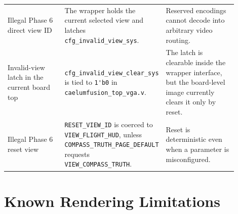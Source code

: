 \documentclass{article}
\newcommand{\sig}[1]{\begingroup\nolinkurl{#1}\endgroup}
\newcommand{\file}[1]{\begingroup\nolinkurl{#1}\endgroup}
\newcommand{\param}[1]{\begingroup\nolinkurl{#1}\endgroup}
\begin{document}
\begin{longtable}{p{0.26\linewidth} p{0.32\linewidth} p{0.32\linewidth}}
Illegal Phase 6 direct view ID &
The wrapper holds the current selected view and latches
\sig{cfg_invalid_view_sys}. &
Reserved encodings cannot decode into arbitrary video routing. \\

Invalid-view latch in the current board top &
\sig{cfg_invalid_view_clear_sys} is tied to \sig{1'b0} in
\file{caelumfusion_top_vga.v}. &
The latch is clearable inside the wrapper interface, but the board-level image
currently clears it only by reset. \\

Illegal Phase 6 reset view &
\param{RESET_VIEW_ID} is coerced to \sig{VIEW_FLIGHT_HUD}, unless
\param{COMPASS_TRUTH_PAGE_DEFAULT} requests \sig{VIEW_COMPASS_TRUTH}. &
Reset is deterministic even when a parameter is misconfigured. \\
\bottomrule
\end{longtable}

\section{Known Rendering Limitations}
\end{document}
